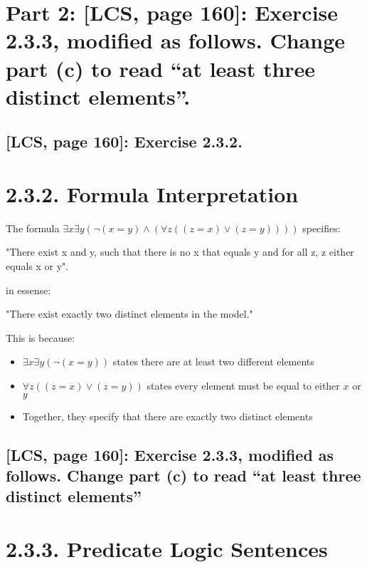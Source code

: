 \documentclass{article}
\begin{document}
\vspace{1em}

\newpage

\section*{Part 2: [LCS, page 160]: Exercise 2.3.3, modified as follows. Change part (c) to read “at least three
distinct elements”.}
\subsection*{[LCS, page 160]: Exercise 2.3.2.}




\section*{2.3.2. Formula Interpretation}

The formula $\exists x \exists y (\neg(x = y) \land (\forall z ((z = x) \lor (z = y))))$ specifies:

\vspace{1em}
"There exist x and y, such that there is no x that equals y and for all z, z either equals x or y".

\vspace{1em}
in essense:

\vspace{1em}
"There exist exactly two distinct elements in the model."

\vspace{1em}
This is because:
\begin{itemize}
    \item $\exists x \exists y (\neg(x = y))$ states there are at least two different elements
    \item $\forall z ((z = x) \lor (z = y))$ states every element must be equal to either $x$ or $y$
    \item Together, they specify that there are exactly two distinct elements
\end{itemize}

\newpage
\subsection*{[LCS, page 160]: Exercise 2.3.3, modified as follows. Change part (c) to read “at least three
distinct elements”}
\section*{2.3.3. Predicate Logic Sentences}
\end{document}
